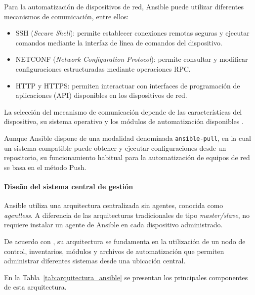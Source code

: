 \documentclass[12pt,a4paper]{article}
\begin{document}
Para la automatización de dispositivos de red, Ansible puede
utilizar diferentes mecanismos de comunicación, entre ellos:

\begin{itemize}

    \item SSH (\textit{Secure Shell}): permite establecer
    conexiones remotas seguras y ejecutar comandos mediante
    la interfaz de línea de comandos del dispositivo.

    \item NETCONF (\textit{Network Configuration Protocol}):
    permite consultar y modificar configuraciones estructuradas
    mediante operaciones RPC.

    \item HTTP y HTTPS: permiten interactuar con interfaces
    de programación de aplicaciones (API) disponibles en los
    dispositivos de red.

\end{itemize}

La selección del mecanismo de comunicación depende de las
características del dispositivo, su sistema operativo y los
módulos de automatización disponibles
\parencite{redhat_ansible_network}.

Aunque Ansible dispone de una modalidad denominada
\texttt{ansible-pull}, en la cual un sistema compatible puede
obtener y ejecutar configuraciones desde un repositorio, su
funcionamiento habitual para la automatización de equipos de
red se basa en el método Push.


\paragraph{Diseño del sistema central de gestión}

Ansible utiliza una arquitectura centralizada sin agentes,
conocida como \textit{agentless}. A diferencia de las arquitecturas
tradicionales de tipo \textit{master/slave}, no requiere instalar
un agente de Ansible en cada dispositivo administrado.

De acuerdo con \textcite{geerling2020ansible}, su arquitectura
se fundamenta en la utilización de un nodo de control, inventarios,
módulos y archivos de automatización que permiten administrar
diferentes sistemas desde una ubicación central.

En la Tabla~\ref{tab:arquitectura_ansible} se presentan los
principales componentes de esta arquitectura.
\end{document}
